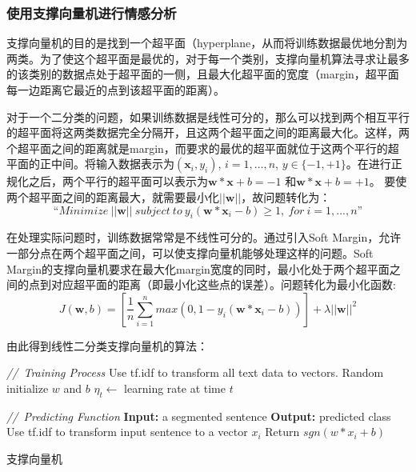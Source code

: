 \subsubsection{使用支撑向量机进行情感分析}
支撑向量机的目的是找到一个超平面（hyperplane，从而将训练数据最优地分割为两类。为了使这个超平面是最优的，对于每一个类别，支撑向量机算法寻求让最多的该类别的数据点处于超平面的一侧，且最大化超平面的宽度（margin，超平面每一边距离它最近的点到该超平面的距离）。

对于一个二分类的问题，如果训练数据是线性可分的，那么可以找到两个相互平行的超平面将这两类数据完全分隔开，且这两个超平面之间的距离最大化。这样，两个超平面之间的距离就是margin，而要求的最优的超平面就位于这两个平行的超平面的正中间。将输入数据表示为$(\textbf{x}_i, y_i)$, $i=1,..., n$, $y \in \{-1,+1\}$。在进行正规化之后，两个平行的超平面可以表示为$\textbf{w}*\textbf{x}+b=-1$ 和$\textbf{w}*\textbf{x}+b=+1$。 要使两个超平面之间的距离最大，就需要最小化$||\textbf{w}||$，故问题转化为：
\begin{equation} \label{eq2.2}
“Minimize\ ||\textbf{w}||\ subject\ to\ y_i(\textbf{w}*\textbf{x}_i-b)\ge 1,\ for\ i=1,...,n”
\end{equation}

在处理实际问题时，训练数据常常是不线性可分的。通过引入Soft Margin，允许一部分点在两个超平面之间，可以使支撑向量机能够处理这样的问题。Soft Margin的支撑向量机要求在最大化margin宽度的同时，最小化处于两个超平面之间的点到对应超平面的距离（即最小化这些点的误差）。问题转化为最小化函数:
\begin{equation} \label{eq2.3}
J(\textbf{w},b)=[\frac{1}{n}\sum_{i=1}^{n}max(0,1-y_i(\textbf{w}*\textbf{x}_i-b))]+\lambda ||\textbf{w}||^2
\end{equation}

由此得到线性二分类支撑向量机的算法：
\IncMargin{1em}
\SetAlCapSkip{1em}
\begin{algorithm}

\emph{//\ Training Process}\;
Use tf.idf to transform all text data to vectors.\;
Random initialize $w$ and $b$\;
$\eta_t\leftarrow$ learning rate at time $t$\;

\BlankLine
\emph{//\ Predicting Function}\;
\textbf{Input:} a segmented sentence\;
\textbf{Output:} predicted class\;
Use tf.idf to transform input sentence to a vector $x_{i}$\;
Return $sgn(w * x_i + b)$
\caption{支撑向量机}\label{SVM}
\label{alog:algorithm1}
\end{algorithm}\DecMargin{1em}


